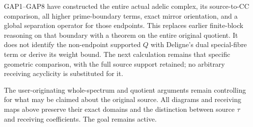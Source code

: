 GAP1--GAP8 have constructed the entire actual adelic complex, its
source-to-CC comparison, all higher prime-boundary terms, exact mirror
orientation, and a global separation operator for those endpoints. This
replaces earlier finite-block reasoning on that boundary with a theorem
on the entire original quotient. It does not identify the non-endpoint
supported \(Q\) with Deligne's dual special-fibre term or derive its
weight bound. The next calculation remains that specific geometric
comparison, with the full source support retained; no arbitrary
receiving acyclicity is substituted for it.

The user-originating whole-spectrum and quotient arguments remain
controlling for what may be claimed about the original source. All
diagrams and receiving maps above preserve their exact domains and the
distinction between source \(\tau\) and receiving coefficients. The goal
remains active.
